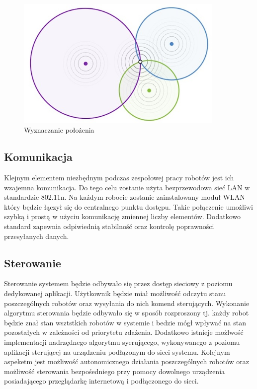 \documentclass[a4paper, 12pt]{article}
\begin{document}
\begin{figure}
\centering
\includegraphics[width=10cm]{img/lokalizacja.jpg}
\caption{Wyznaczanie położenia}
\label{fig:lokalizaja}
\end{figure}


\subsection{Komunikacja}
Klejnym elementem niezbędnym podczas zespołowej pracy robotów jest ich wzajemna komunikacja. Do tego celu zostanie użyta bezprzewodowa sieć LAN w standardzie 802.11n. Na każdym robocie zostanie zainstalowany moduł WLAN który będzie łączył się do centralnego punktu dostępu. Takie połączenie umożliwi szybką i prostą w użyciu komunikację zmiennej liczby elementów. Dodatkowo standard zapewnia odpiwiednią stabilność oraz kontrolę poprawności przesyłanych danych. 

\subsection{Sterowanie}
Sterowanie systemem będzie odbywało się przez dostęp sieciowy z poziomu dedykowanej aplikacji. Użytkownik będzie miał możliwość odczytu stanu poszczególnych robotów oraz wysyłania do nich komend sterujących. Wykonanie algorytmu sterowania będzie odbywało się w sposób rozproszony tj. każdy robot będzie znał stan wsztstkich robotów w systemie i bedzie mógł wpływać na stan pozostałych w zależności od priorytetu zdażenia. Dodatkowo istnieje możlwość implementacji nadrzędnego algorytmu syerującego, wykonywanego z poziomu aplikacji sterującej na urządzeniu podłązonym do sieci systemu. Kolejnym aspeketm jest możliwość autonomicznego działania poszczególnych robotów oraz możliwość sterowania bezpośedniego przy pomocy dowolnego urządzenia posiadającego przeglądarkę internetową i podłączonego do sieci. 
\end{document}
